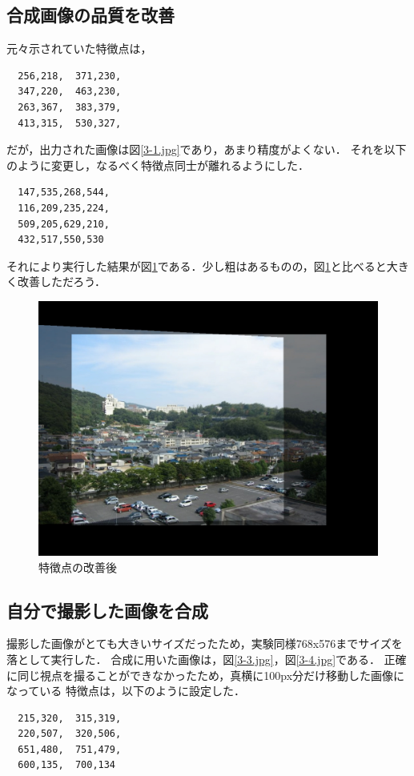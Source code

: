 \documentclass[11pt]{jarticle}
\begin{document}
\subsection{合成画像の品質を改善}
元々示されていた特徴点は，
\begin{verbatim}
  256,218,  371,230,
  347,220,  463,230,
  263,367,  383,379,
  413,315,  530,327,
\end{verbatim}
だが，出力された画像は図\ref{3-1.jpg}であり，あまり精度がよくない．
それを以下のように変更し，なるべく特徴点同士が離れるようにした．
\begin{verbatim}
  147,535,268,544,
  116,209,235,224,
  509,205,629,210,
  432,517,550,530
\end{verbatim}

それにより実行した結果が図\ref{3-2.jpg}である．少し粗はあるものの，図\ref{3-2.jpg}と比べると大きく改善しただろう．
\begin{figure}[ht]
\centering
\includegraphics[scale=.3]{3-2.jpg}
\caption{特徴点の改善後}
\label{3-2.jpg}
\end{figure}

\subsection{自分で撮影した画像を合成}
撮影した画像がとても大きいサイズだったため，実験同様768x576までサイズを落として実行した．
合成に用いた画像は，図\ref{3-3.jpg}，図\ref{3-4.jpg}である．
正確に同じ視点を撮ることができなかったため，真横に100px分だけ移動した画像になっている
特徴点は，以下のように設定した．
\begin{verbatim}
  215,320,  315,319,
  220,507,  320,506,
  651,480,  751,479,
  600,135,  700,134
\end{verbatim}
\end{document}

